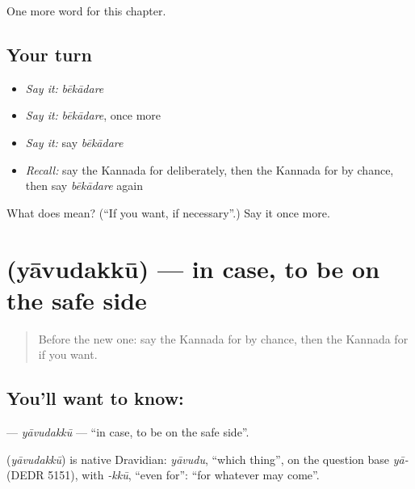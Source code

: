 \begin{grammarlens}[title={What you've built}]
One more word for this chapter.
\end{grammarlens}

\subsection*{Your turn}
\begin{itemize}
\raggedright
  \item \emph{Say it:} \emph{bēkādare}
  \item \emph{Say it:} \emph{bēkādare}, once more
  \item \emph{Say it:} say \emph{bēkādare}
  \item \emph{Recall:} say the Kannada for deliberately, then the Kannada for by chance, then say \emph{bēkādare} again
\end{itemize}

\begin{tcolorbox}[breakable,colback=teal!4,colframe=teal!35!black,title={Before you move on}]
What does  mean? (\textquotedblleft{}If you want, if necessary\textquotedblright{}.) Say it once more.
\end{tcolorbox}
\section[\texorpdfstring{\kn{ಯಾವುದಕ್ಕೂ} (yāvudakkū)}{ಯಾವುದಕ್ಕೂ (yāvudakkū)}]{ (yāvudakkū) — in case, to be on the safe side}

\label{lesson:KA-C178-yavudakku}



\begin{quote}
Before the new one: say the Kannada for by chance, then the Kannada for if you want.
\end{quote}

\subsection*{You'll want to know: }
\textbf{} — \emph{yāvudakkū} — \textquotedblleft{}in case, to be on the safe side\textquotedblright{}.

\begin{cousinweb}
\textbf{} (\emph{yāvudakkū}) is native Dravidian: \emph{yāvudu}, \textquotedblleft{}which thing\textquotedblright{}, on the question base \emph{yā-} (DEDR 5151), with \emph{-kkū}, \textquotedblleft{}even for\textquotedblright{}: \textquotedblleft{}for whatever may come\textquotedblright{}.
\end{cousinweb}

